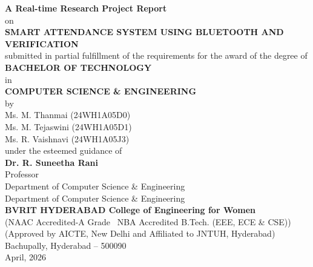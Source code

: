 \documentclass[12pt,a4paper]{report}
\begin{document}
\begin{titlepage}
\begin{center}
\vspace*{0.3cm}
{\Large \textbf{A Real-time Research Project Report}}\\[0.4cm]
{\large on}\\[0.4cm]
{\LARGE \textbf{SMART ATTENDANCE SYSTEM USING BLUETOOTH AND VERIFICATION}}\\[0.6cm]
{\large submitted in partial fulfillment of the requirements for the award of the degree of}\\[0.3cm]
{\Large \textbf{BACHELOR OF TECHNOLOGY}}\\[0.2cm]
{\large in}\\[0.2cm]
{\Large \textbf{COMPUTER SCIENCE \& ENGINEERING}}\\[0.7cm]

{\large by}\\[0.2cm]
{\large Ms. M. Thanmai \hspace{0.4cm} (24WH1A05D0)}\\
{\large Ms. M. Tejaswini \hspace{0.4cm} (24WH1A05D1)}\\
{\large Ms. R. Vaishnavi \hspace{0.4cm} (24WH1A05J3)}\\[0.7cm]

{\large under the esteemed guidance of}\\[0.2cm]
{\large \textbf{Dr. R. Suneetha Rani}}\\
{\large Professor}\\
{\large Department of Computer Science \& Engineering}\\[0.7cm]

{\large Department of Computer Science \& Engineering}\\
{\large \textbf{BVRIT HYDERABAD College of Engineering for Women}}\\
{\small (NAAC Accredited-A Grade \textbar\ NBA Accredited B.Tech. (EEE, ECE \& CSE))}\\
{\small (Approved by AICTE, New Delhi and Affiliated to JNTUH, Hyderabad)}\\
{\small Bachupally, Hyderabad -- 500090}\\[0.5cm]
{\large April, 2026}
\end{center}
\end{titlepage}
\end{document}
